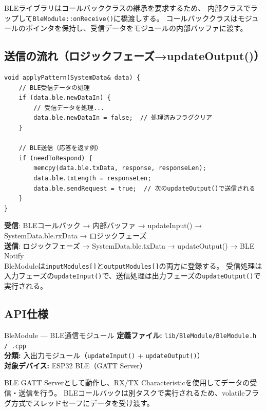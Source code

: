 \begin{pointbox}[コールバックからモジュールへの橋渡し]
BLEライブラリはコールバッククラスの継承を要求するため、
内部クラスでラップして\texttt{BleModule::onReceive()}に橋渡しする。
コールバッククラスはモジュールのポインタを保持し、受信データをモジュールの内部バッファに渡す。
\end{pointbox}

\subsection{送信の流れ（ロジックフェーズ→updateOutput()）}

\begin{lstlisting}[style=cppstyle, caption={ロジックフェーズでの送信リクエスト}]
void applyPattern(SystemData& data) {
    // BLE受信データの処理
    if (data.ble.newDataIn) {
        // 受信データを処理...
        data.ble.newDataIn = false;  // 処理済みフラグクリア
    }

    // BLE送信（応答を返す例）
    if (needToRespond) {
        memcpy(data.ble.txData, response, responseLen);
        data.ble.txLength = responseLen;
        data.ble.sendRequest = true;  // 次のupdateOutput()で送信される
    }
}
\end{lstlisting}

\begin{notebox}[双方向通信のデータフロー]
\textbf{受信}: BLEコールバック → 内部バッファ → updateInput() → SystemData.ble.rxData → ロジックフェーズ\\
\textbf{送信}: ロジックフェーズ → SystemData.ble.txData → updateOutput() → BLE Notify\\
BleModuleは\texttt{inputModules[]}と\texttt{outputModules[]}の両方に登録する。
受信処理は入力フェーズの\texttt{updateInput()}で、送信処理は出力フェーズの\texttt{updateOutput()}で実行される。
\end{notebox}

\subsection{API仕様}


\begin{apibox}{BleModule --- BLE通信モジュール}
\textbf{定義ファイル:} \texttt{lib/BleModule/BleModule.h / .cpp}\\
\textbf{分類:} 入出力モジュール（\texttt{updateInput()} + \texttt{updateOutput()}）\\
\textbf{対象デバイス:} ESP32 BLE（GATT Server）

BLE GATT Serverとして動作し、RX/TX Characteristicを使用してデータの受信・送信を行う。
BLEコールバックは別タスクで実行されるため、volatileフラグ方式でスレッドセーフにデータを受け渡す。
\end{apibox}

